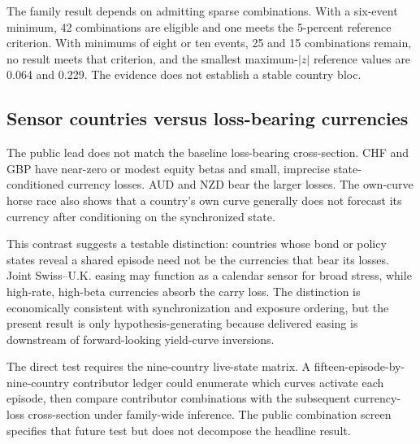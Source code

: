 The family result depends on admitting sparse combinations. With a six-event minimum, 42 combinations are eligible and one meets the 5-percent reference criterion. With minimums of eight or ten events, 25 and 15 combinations remain, no result meets that criterion, and the smallest maximum-$|z|$ reference values are 0.064 and 0.229. The evidence does not establish a stable country bloc.

\subsection{Sensor countries versus loss-bearing currencies}

The public lead does not match the baseline loss-bearing cross-section. CHF and GBP have near-zero or modest equity betas and small, imprecise state-conditioned currency losses. AUD and NZD bear the larger losses. The own-curve horse race also shows that a country's own curve generally does not forecast its currency after conditioning on the synchronized state.

This contrast suggests a testable distinction: countries whose bond or policy states reveal a shared episode need not be the currencies that bear its losses. Joint Swiss--U.K. easing may function as a calendar sensor for broad stress, while high-rate, high-beta currencies absorb the carry loss. The distinction is economically consistent with synchronization and exposure ordering, but the present result is only hypothesis-generating because delivered easing is downstream of forward-looking yield-curve inversions.

The direct test requires the nine-country live-state matrix. A fifteen-episode-by-nine-country contributor ledger could enumerate which curves activate each episode, then compare contributor combinations with the subsequent currency-loss cross-section under family-wide inference. The public combination screen specifies that future test but does not decompose the headline result.
